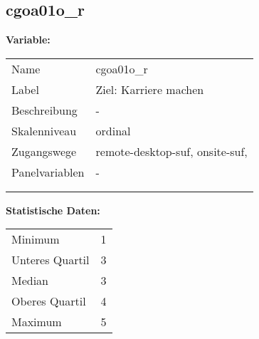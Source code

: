 	
	
	\subsection{cgoa01o\_r}
	\label{subSection:cgoa01o_r}

	\noindent\textbf{Variable:}\\
		\begin{tabular}{lL{11.3cm}}
			\label{tableVariable:cgoa01o_r}
			Name & cgoa01o\_r \\
			Label & Ziel: Karriere machen \\
			Beschreibung & - \\
			Skalenniveau & ordinal \\
			Zugangswege &
				remote-desktop-suf,
				onsite-suf,
 \\
			Panelvariablen & -
			 \\
			 \\
 \\
		\end{tabular}



		\vspace*{1 cm}
		\noindent\textbf{Statistische Daten:}\\
			\begin{tabular}{ll}
				\label{tableStatistics:cgoa01o_r}
					Minimum & 1 \\
					Unteres Quartil & 3 \\
					Median & 3 \\
					Oberes Quartil & 4 \\
					Maximum & 5 \\
			\end{tabular}



